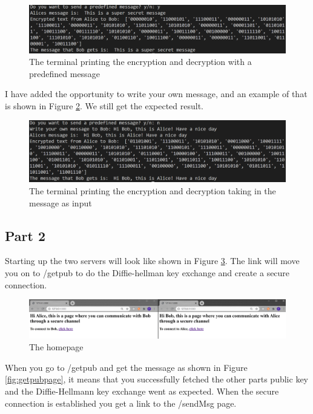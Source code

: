 \documentclass[12pt, letterpaper]{article}
\begin{document}
\begin{figure}[H]
  \includegraphics[width=\linewidth]{code_snippets/runY.PNG}
  \caption{The terminal printing the encryption and decryption with a predefined message}
  \label{fig:runY}
\end{figure}

I have added the opportunity to write your own message, and an example of that is shown in Figure \ref{fig:runN}. We still get the expected result.

\begin{figure}[H]
  \includegraphics[width=\linewidth]{code_snippets/runN.PNG}
  \caption{The terminal printing the encryption and decryption taking in the message as input}
  \label{fig:runN}
\end{figure}


\subsection*{Part 2}
Starting up the two servers will look like shown in Figure \ref{fig:front}. The link will move you on to /getpub to do the Diffie-hellman key exchange and create a secure connection.

\begin{figure}[H]
  \hspace*{-50px}\includegraphics[width=500px]{code_snippets/front.PNG}
  \caption{The homepage}
  \label{fig:front}
\end{figure}

When you go to /getpub and get the message as shown in Figure \ref{fig:getpubpage}, it means that you successfully fetched the other parts public key and the Diffie-Hellmann key exchange went as expected. When the secure connection is established you get a link to the /sendMsg page.
\end{document}
